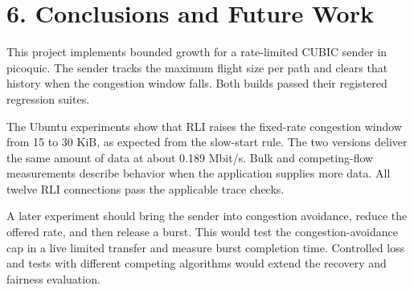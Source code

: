 
\clearpage
\section*{6. Conclusions and Future Work}
\label{sec:conclusions}

This project implements bounded growth for a rate-limited CUBIC sender in picoquic. The sender tracks the maximum flight size per path and clears that history when the congestion window falls. Both builds passed their registered regression suites.

The Ubuntu experiments show that RLI raises the fixed-rate congestion window from 15 to 30 KiB, as expected from the slow-start rule. The two versions deliver the same amount of data at about 0.189 Mbit/s. Bulk and competing-flow measurements describe behavior when the application supplies more data. All twelve RLI connections pass the applicable trace checks.

A later experiment should bring the sender into congestion avoidance, reduce the offered rate, and then release a burst. This would test the congestion-avoidance cap in a live limited transfer and measure burst completion time. Controlled loss and tests with different competing algorithms would extend the recovery and fairness evaluation.
\label{sec:conclusions-end}

